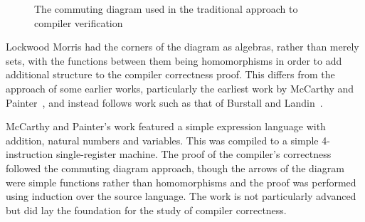 \documentclass[a4paper,10pt]{report}
\begin{document}
\begin{figure}[ht]
  \begin{center}
  \end{center}
  \caption{The commuting diagram used in the traditional approach to compiler verification}
  \label{commuting-diagram}
\end{figure}

Lockwood Morris had the corners of the diagram as algebras, rather than merely
sets, with the functions between them being homomorphisms in order to add
additional structure to the compiler correctness proof.  This differs from the
approach of some earlier works, particularly the earliest work by McCarthy and
Painter~\cite{mccarthy1967}, and instead follows work such as that of Burstall
and Landin~\cite{burstall1969}.

McCarthy and Painter's work featured a simple expression language with addition,
natural numbers and variables.  This was compiled to a simple 4-instruction
single-register machine. The proof of the compiler's correctness followed the
commuting diagram approach, though the arrows of the diagram were simple
functions rather than homomorphisms and the proof was performed using induction
over the source language. The work is not particularly advanced but did lay the
foundation for the study of compiler correctness.
\end{document}
